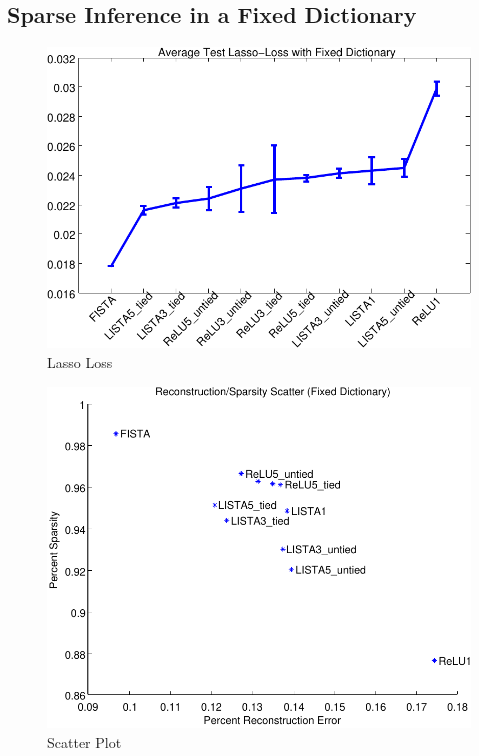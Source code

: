 \subsection{Sparse Inference in a Fixed Dictionary}      

\begin{figure} \centering
\includegraphics[scale=0.75]{./figures/LISTA/fixed_decoder_loss.pdf}
\caption{Lasso Loss} \label{fig:lasso_loss} \end{figure}  

\begin{figure} \centering
\includegraphics[scale=0.75]{./figures/LISTA/fixed_decoder_scatter.pdf}
\caption{Scatter Plot} \label{fig:scatter_fixed} \end{figure}  

